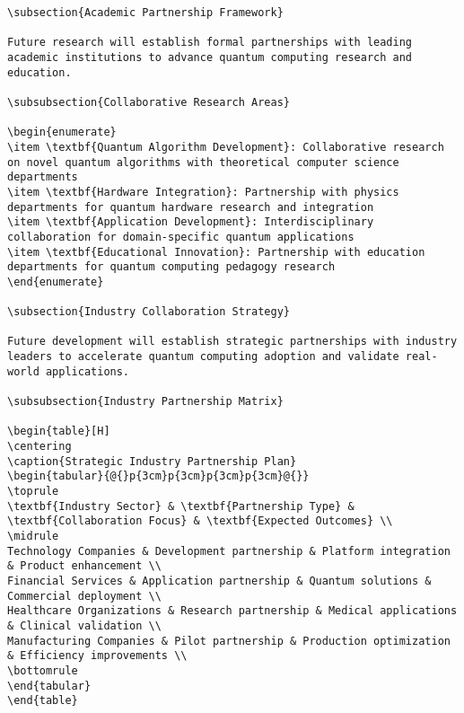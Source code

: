 \documentclass[12pt,a4paper]{report}
\begin{document}
\begin{lstlisting}
\subsection{Academic Partnership Framework}

Future research will establish formal partnerships with leading academic institutions to advance quantum computing research and education.

\subsubsection{Collaborative Research Areas}

\begin{enumerate}
\item \textbf{Quantum Algorithm Development}: Collaborative research on novel quantum algorithms with theoretical computer science departments
\item \textbf{Hardware Integration}: Partnership with physics departments for quantum hardware research and integration
\item \textbf{Application Development}: Interdisciplinary collaboration for domain-specific quantum applications
\item \textbf{Educational Innovation}: Partnership with education departments for quantum computing pedagogy research
\end{enumerate}

\subsection{Industry Collaboration Strategy}

Future development will establish strategic partnerships with industry leaders to accelerate quantum computing adoption and validate real-world applications.

\subsubsection{Industry Partnership Matrix}

\begin{table}[H]
\centering
\caption{Strategic Industry Partnership Plan}
\begin{tabular}{@{}p{3cm}p{3cm}p{3cm}p{3cm}@{}}
\toprule
\textbf{Industry Sector} & \textbf{Partnership Type} & \textbf{Collaboration Focus} & \textbf{Expected Outcomes} \\
\midrule
Technology Companies & Development partnership & Platform integration & Product enhancement \\
Financial Services & Application partnership & Quantum solutions & Commercial deployment \\
Healthcare Organizations & Research partnership & Medical applications & Clinical validation \\
Manufacturing Companies & Pilot partnership & Production optimization & Efficiency improvements \\
\bottomrule
\end{tabular}
\end{table}


\end{lstlisting}
\end{document}
